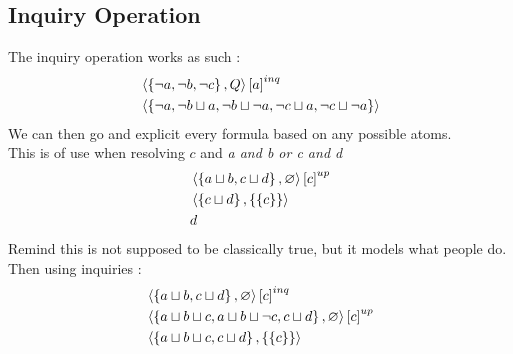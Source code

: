 \documentclass{cours}
\begin{document}
\subsection{Inquiry Operation}

The inquiry operation works as such : 
\[
\begin{aligned}
    &\left\langle \left\{\lnot a, \lnot b, \lnot c\right\}, Q \right\rangle\left[a\right]^{inq}\\
    &\left\langle \left\{\lnot a, \lnot b \sqcup a, \lnot b \sqcup \lnot a, \lnot c \sqcup a, \lnot c \sqcup \lnot a\right\} \right\rangle
\end{aligned}    
\]
We can then go and explicit every formula based on any possible atoms. \\
This is of use when resolving $c$ and \textsl{a and b or c and d}
\[
    \begin{aligned}
        &\left\langle \left\{a \sqcup b, c \sqcup d\right\}, \varnothing \right\rangle\left[c\right]^{up}\\
        &\left\langle \left\{c \sqcup d\right\}, \left\{\{c\}\right\} \right\rangle\\
        &d
    \end{aligned}    
\]
Remind this is not supposed to be classically true, but it models what people do. Then using inquiries : 
\[
    \begin{aligned}
        &\left\langle \left\{a \sqcup b, c \sqcup d\right\}, \varnothing \right\rangle\left[c\right]^{inq}\\
        &\left\langle \left\{a \sqcup b \sqcup c, a \sqcup b \sqcup \lnot c, c \sqcup d\right\}, \varnothing \right\rangle\left[c\right]^{up}\\
        &\left\langle \left\{a \sqcup b \sqcup c, c \sqcup d\right\}, \left\{\left\{c\right\}\right\} \right\rangle
    \end{aligned}
\]
\end{document}
